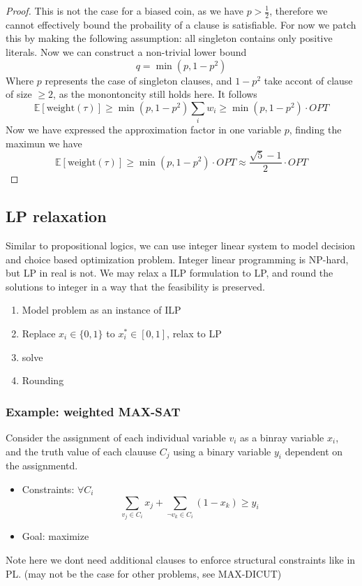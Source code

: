 \documentclass[10pt]{article}
\theoremstyle{definition}
\begin{document}
\begin{proof}
This is not the case for a biased coin, as we have $p > \frac{1}{2}$, therefore we cannot effectively bound the probaility of a clause is satisfiable. 
For now we patch this by making the following assumption: all singleton contains only positive literals. Now we can construct a non-trivial lower bound 
\[q = \min(p, 1 - p^2)\]
Where $p$ represents the case of singleton clauses, and $1 - p^2$ take accont of clause of size $\geq 2$, as the 
monontoncity still holds here. It follows 
\[\mathbb{E}[\text{weight}(\tau)] \geq \min(p, 1 - p^2) \sum_i w_i \geq \min(p, 1 - p^2)\cdot OPT\]
Now we have expressed the approximation factor in one variable $p$, finding the maximun we have 
\[\mathbb{E}[\text{weight}(\tau)] \geq \min(p, 1 - p^2)\cdot OPT \approx \frac{\sqrt{5} - 1}{2} \cdot OPT\]
\end{proof}



\subsection{LP relaxation}
Similar to propositional logics, we can use integer linear system to model decision and choice based optimization problem.
Integer linear programming is NP-hard, but LP in real is not. We may relax a ILP formulation to LP, and round the solutions to 
integer in a way that the feasibility is preserved. 
\begin{enumerate}
  \item Model problem as an instance of ILP
  \item Replace $x_i \in \{0, 1\} $ to $x^*_i \in [0,1]$, relax to LP
  \item solve
  \item Rounding 
\end{enumerate}
\subsubsection*{Example: weighted MAX-SAT}
Consider the assignment of each individual variable $v_i$ as a binray variable $x_i$, and the truth value of each clauuse $C_j$ using a 
binary variable $y_i$ dependent on the assignmentd. 
\begin{itemize}
  \item Constraints: $\forall C_i$
  \[
    \sum_{v_j \in C_i} x_j + \sum_{\neg v_k \in C_i} (1 - x_k) \geq y_i
  \]
  \item Goal: maximize
\end{itemize}
Note here we dont need additional clauses to enforce structural constraints like in PL. (may not be the case for other problems, see MAX-DICUT)
\end{document}
